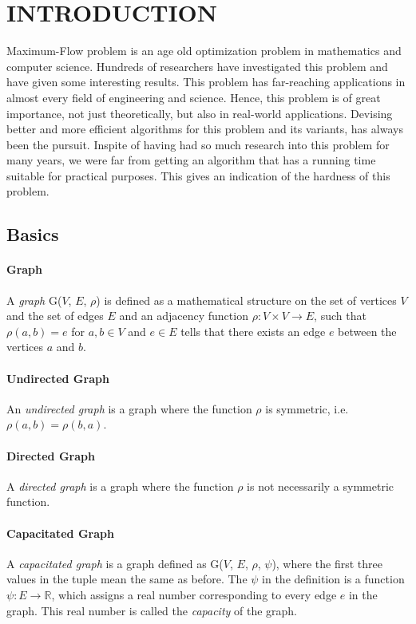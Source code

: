 \documentclass[BTech]{iitmdiss}
\begin{document}
 \chapter{INTRODUCTION}
 \label{chap:intro}
    Maximum-Flow problem is an age old optimization problem in mathematics and computer science. Hundreds of researchers have investigated this problem
    and have given some interesting results. This problem has far-reaching applications in almost every field of engineering and science. Hence, this 
    problem is of great importance, not just theoretically, but also in real-world applications. Devising better and more efficient algorithms
    for this problem and its variants, has always been the pursuit. Inspite of having had so much research into this problem for many years, we were far from getting an algorithm
    that has a running time suitable for practical purposes. This gives an indication of the hardness of this problem.
    
    \section{Basics}
      \subsubsection{Graph}
      A \textit{graph} G($V$, $E$, $\rho$) is defined as a mathematical structure on the set of vertices $V$ and the set of edges $E$ and an adjacency
      function $\rho : V \times V \rightarrow E$, such that $\rho(a,b) = e$ for $a,b \in V$ and $e \in E$ tells that there exists an edge $e$ between 
      the vertices $a$ and $b$.
      
      \subsubsection{Undirected Graph}
	An \textit{undirected graph} is a graph where the function $\rho$ is symmetric, i.e. $\rho(a,b) = \rho(b,a)$.
 
      \subsubsection{Directed Graph}
	A \textit{directed graph} is a graph where the function $\rho$ is not necessarily a symmetric function.
	
      \subsubsection{Capacitated Graph}
	A \textit{capacitated graph} is a graph defined as G($V$, $E$, $\rho$, $\psi$), where the first three values in the tuple mean the same as before.
	The $\psi$ in the definition is a function $\psi: E \rightarrow \mathbb{R}$, which assigns a real number corresponding to every edge $e$ in the 
	graph. This real number is called the \textit{capacity} of the graph.
      
\end{document}
